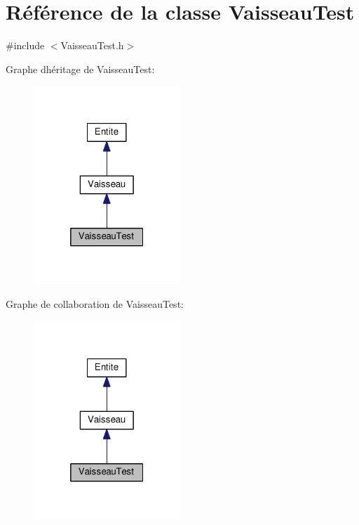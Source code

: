 \hypertarget{class_vaisseau_test}{}\section{Référence de la classe Vaisseau\+Test}
\label{class_vaisseau_test}


{\ttfamily \#include $<$Vaisseau\+Test.\+h$>$}



Graphe d\textquotesingle{}héritage de Vaisseau\+Test\+:\nopagebreak
\begin{figure}[H]
\begin{center}
\leavevmode
\includegraphics[width=157pt]{class_vaisseau_test__inherit__graph}
\end{center}
\end{figure}


Graphe de collaboration de Vaisseau\+Test\+:\nopagebreak
\begin{figure}[H]
\begin{center}
\leavevmode
\includegraphics[width=157pt]{class_vaisseau_test__coll__graph}
\end{center}
\end{figure}
